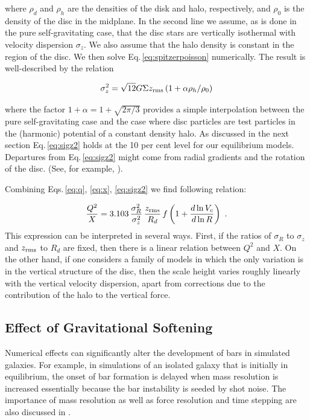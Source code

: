\noindent where $\rho_d$ and $\rho_h$ are the densities of the disk
and halo, respectively, and $\rho_0$ is the density of the disc in the
midplane.  In the second line we assume, as is done in the pure
self-gravitating case, that the disc stars are vertically isothermal
with velocity dispersion $\sigma_z$.  We also assume that the halo
density is constant in the region of the disc.  We then solve
Eq.\,\ref{eq:spitzerpoisson} numerically.  The result is
well-described by the relation

\begin{equation}\label{eq:sigz2}
\sigma_z^2 = \sqrt{12} 
G\Sigma z_{\rm rms} \left (1 + \alpha\rho_h/\rho_0\right )
\end{equation}

\noindent where the factor $1 + \alpha = 1 + \sqrt{2\pi/3}$ provides a
simple interpolation between the pure self-gravitating case and the
case where disc particles are test particles in the (harmonic)
potential of a constant density halo.  As discussed in the next
section Eq.\,\ref{eq:sigz2} holds at the 10 per cent level for our
equilibrium models.  Departures from Eq.\,\ref{eq:sigz2} might come
from radial gradients and the rotation of the disc. (See, for example,
\citet{read2014}).

Combining Eqs.\,\ref{eq:q}, \ref{eq:x}, \ref{eq:sigz2} we find 
following relation:

\begin{equation}\label{eq:r}
\frac{Q^2}{X} = 3.103 \,
\frac{\sigma_R^2}{\sigma_z^2} \,
\frac{z_{\rm rms}}{R_d}\,
f\left (1 + \frac{d\ln V_c}{d\ln R}\right )~.
\end{equation}
\noindent This expression can be interpreted in several ways.  First,
if the ratios of $\sigma_R$ to $\sigma_z$ and $z_{\rm rms}$ to $R_d$ are
fixed, then there is a linear relation between $Q^2$ and $X$.  On the
other hand, if one considers a family of models in which the only
variation is in the vertical structure of the disc, then the scale
height varies roughly linearly with the vertical velocity dispersion,
apart from corrections due to the contribution of the halo to the
vertical force.

\subsection{Effect of Gravitational Softening} 

Numerical effects can significantly alter the development of bars in
simulated galaxies. For example, in simulations of an isolated galaxy
that is initially in equilibrium, the onset of bar formation is
delayed when mass resolution is increased \citep{dbs2009}
essentially because the bar instability is seeded by shot noise.  The
importance of mass resolution as well as force resolution and time
stepping are also discussed in \citet{Klypin2009}.

